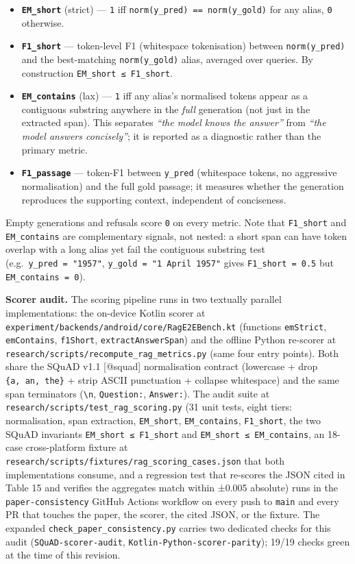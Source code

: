 \begin{itemize}
\tightlist
\item
  \textbf{\texttt{EM\_short}} (strict) --- \texttt{1} iff
  \texttt{norm(y\_pred)\ ==\ norm(y\_gold)} for any alias, \texttt{0} otherwise.
\item
  \textbf{\texttt{F1\_short}} --- token-level F1 (whitespace tokenisation)
  between \texttt{norm(y\_pred)} and the best-matching \texttt{norm(y\_gold)}
  alias, averaged over queries. By construction
  \texttt{EM\_short\ ≤\ F1\_short}.
\item
  \textbf{\texttt{EM\_contains}} (lax) --- \texttt{1} iff any alias's normalised
  tokens appear as a contiguous substring anywhere in the \emph{full} generation
  (not just in the extracted span). This separates \emph{``the model knows the
  answer''} from \emph{``the model answers concisely''}; it is reported as a
  diagnostic rather than the primary metric.
\item
  \textbf{\texttt{F1\_passage}} --- token-F1 between \texttt{y\_pred}
  (whitespace tokens, no aggressive normalisation) and the full gold passage; it
  measures whether the generation reproduces the supporting context, independent
  of conciseness.
\end{itemize}

Empty generations and refusals score \texttt{0} on every metric. Note that
\texttt{F1\_short} and \texttt{EM\_contains} are complementary signals, not
nested: a short span can have token overlap with a long alias yet fail the
contiguous substring test (e.g.~\texttt{y\_pred\ =\ "1957"},
\texttt{y\_gold\ =\ "1\ April\ 1957"} gives \texttt{F1\_short\ =\ 0.5} but
\texttt{EM\_contains\ =\ 0}).

\textbf{Scorer audit.} The scoring pipeline runs in two textually parallel
implementations: the on-device Kotlin scorer at
\texttt{experiment/backends/android/core/RagE2EBench.kt} (functions
\texttt{emStrict}, \texttt{emContains}, \texttt{f1Short},
\texttt{extractAnswerSpan}) and the offline Python re-scorer at
\texttt{research/scripts/recompute\_rag\_metrics.py} (same four entry points).
Both share the SQuAD v1.1 {[}@squad{]} normalisation contract (lowercase + drop
\texttt{\{a,\ an,\ the\}} + strip ASCII punctuation + collapse whitespace) and
the same span terminators (\texttt{\textbackslash{}n}, \texttt{Question:},
\texttt{Answer:}). The audit suite at
\texttt{research/scripts/test\_rag\_scoring.py} (31 unit tests, eight tiers:
normalisation, span extraction, \texttt{EM\_short}, \texttt{EM\_contains},
\texttt{F1\_short}, the two SQuAD invariants \texttt{EM\_short\ ≤\ F1\_short}
and \texttt{EM\_short\ ≤\ EM\_contains}, an 18-case cross-platform fixture at
\texttt{research/scripts/fixtures/rag\_scoring\_cases.json} that both
implementations consume, and a regression test that re-scores the JSON cited in
Table 15 and verifies the aggregates match within ±0.005 absolute) runs in the
\texttt{paper-consistency} GitHub Actions workflow on every push to
\texttt{main} and every PR that touches the paper, the scorer, the cited JSON,
or the fixture. The expanded \texttt{check\_paper\_consistency.py} carries two
dedicated checks for this audit (\texttt{SQuAD-scorer-audit},
\texttt{Kotlin-Python-scorer-parity}); 19/19 checks green at the time of this
revision.

